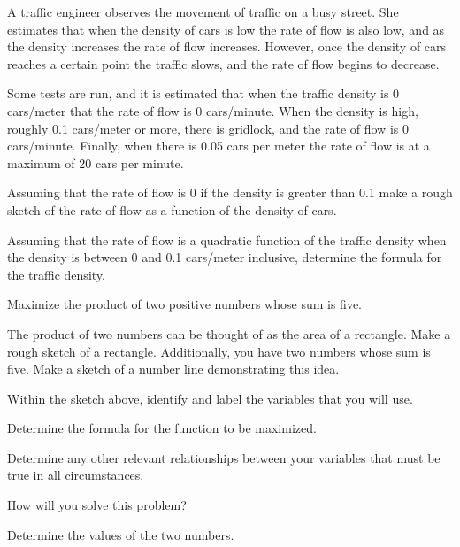 \begin{problem}

\item A traffic engineer observes the movement of traffic on a busy
  street. She estimates that when the density of cars is low the rate
  of flow is also low, and as the density increases the rate of flow
  increases. However, once the density of cars reaches a certain point
  the traffic slows, and the rate of flow begins to decrease.

  Some tests are run, and it is estimated that when the traffic
  density is 0 cars/meter that the rate of flow is 0 cars/minute. When
  the density is high, roughly 0.1 cars/meter or more, there is
  gridlock, and the rate of flow is 0 cars/minute. Finally, when there
  is 0.05 cars per meter the rate of flow is at a maximum of 20 cars
  per minute.
  
  \begin{subproblem}
  \item Assuming that the rate of flow is 0 if the density is greater
    than 0.1 make a rough sketch of the rate of flow as a function of
    the density of cars.
    \vfill
  \item Assuming that the rate of flow is a quadratic function of the
    traffic density when the density is between 0 and 0.1 cars/meter
    inclusive, determine the formula for the traffic density.
    \vfill
  \end{subproblem}

  \clearpage

\item Maximize the product of two positive numbers whose sum is five.
\begin{subproblem}
  \item The product of two numbers can be thought of as the area of a
    rectangle. Make a rough sketch of a rectangle. Additionally, you
    have two numbers whose sum is five. Make a sketch of a number line
    demonstrating this idea.
    \vfill
  \item Within the sketch above, identify and label the variables
    that you will use.
  \item Determine the formula for the function to be maximized.
    \vfill
  \item Determine any other relevant relationships between your
    variables that must be true in all circumstances.  
    \vfill
  \item How will you solve this problem?
    \vfill
  \item Determine the values of the two numbers.
    \vfill
    \vfill
\end{subproblem}


\end{problem}
